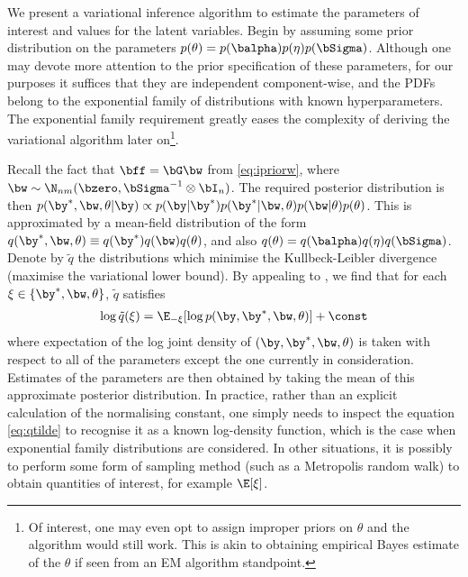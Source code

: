 We present a variational inference algorithm to estimate the parameters of interest and values for the latent variables.
Begin by assuming some prior distribution on the parameters $p(\theta) = p(\balpha)p(\eta)p(\bSigma)$. 
Although one may devote more attention to the prior specification of these parameters, for our purposes it suffices that they are independent component-wise, and the PDFs belong to the exponential family of distributions with known hyperparameters.
The exponential family requirement greatly eases the complexity of deriving the variational algorithm later on\footnote{
Of interest, one may even opt to assign improper priors on $\theta$ and the algorithm would still work.
This is akin to obtaining empirical Bayes estimate of the $\theta$ if seen from an EM algorithm standpoint.
}.

Recall the fact that $\bff = \bG\bw$ from \eqref{eq:ipriorw}, where $\bw \sim \N_{nm}(\bzero, \bSigma^{-1} \otimes \bI_n)$.
The required posterior distribution is then $
  p(\by^*,\bw,\theta|\by) \propto p(\by|\by^*)p(\by^*|\bw,\theta)p(\bw|\theta)p(\theta)
$.
This is approximated by a mean-field distribution of the form $q(\by^*,\bw,\theta) \equiv q(\by^*)q(\bw)q(\theta)$, and also $q(\theta) = q(\balpha)q(\eta)q(\bSigma)$.
Denote by $\tilde q$ the distributions which minimise the Kullbeck-Leibler divergence (maximise the variational lower bound).
By appealing to \cite[equation 10.9, p.466]{bishop2006pattern}, we find that for each $\xi \in \{ \by^*,\bw,\theta \}$, $\tilde q$ satisfies
\begin{align}\label{eq:qtilde}
  \log \tilde q(\xi) = \E_{-\xi} [\log p(\by, \by^*, \bw, \theta)] + \const
\end{align}
where expectation of the log joint density of $(\by, \by^*, \bw, \theta)$ is taken with respect to all of the parameters except the one currently in consideration.
Estimates of the parameters are then obtained by taking the mean of this approximate posterior distribution.
In practice, rather than an explicit calculation of the normalising constant, one simply needs to inspect the equation \eqref{eq:qtilde} to recognise it as a known log-density function, which is the case when exponential family distributions are considered.
In other situations, it is possibly to perform some form of sampling method (such as a Metropolis random walk) to obtain quantities of interest, for example $\E[\xi]$.

